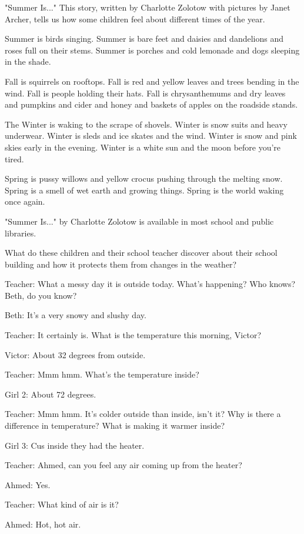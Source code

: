 "Summer Is..." This story, written by Charlotte Zolotow with pictures by Janet Archer, tells us how some children feel about different times of the year.

Summer is birds singing. Summer is bare feet and daisies and dandelions and roses full on their stems. Summer is porches and cold lemonade and dogs sleeping in the shade.

Fall is squirrels on rooftops. Fall is red and yellow leaves and trees bending in the wind. Fall is people holding their hats. Fall is chrysanthemums and dry leaves and pumpkins and cider and honey and baskets of apples on the roadside stands.

The Winter is waking to the scrape of shovels. Winter is snow suits and heavy underwear. Winter is sleds and ice skates and the wind. Winter is snow and pink skies early in the evening. Winter is a white sun and the moon before you're tired.

Spring is pussy willows and yellow crocus pushing through the melting snow. Spring is a smell of wet earth and growing things. Spring is the world waking once again.

"Summer Is..." by Charlotte Zolotow is available in most school and public libraries.

What do these children and their school teacher discover about their school building and how it protects them from changes in the weather?

Teacher: What a messy day it is outside today. What's happening? Who knows? Beth, do you know?

Beth: It's a very snowy and slushy day.

Teacher: It certainly is. What is the temperature this morning, Victor?

Victor: About 32 degrees from outside.

Teacher: Mmm hmm. What's the temperature inside?

Girl 2: About 72 degrees.

Teacher: Mmm hmm. It's colder outside than inside, isn't it? Why is there a difference in temperature? What is making it warmer inside?

Girl 3: Cus inside they had the heater.

Teacher: Ahmed, can you feel any air coming up from the heater?

Ahmed: Yes.

Teacher: What kind of air is it?

Ahmed: Hot, hot air.

